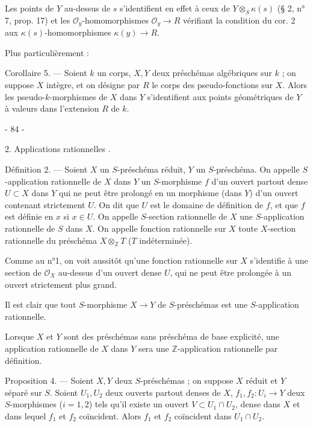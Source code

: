 Les points de $Y$ au-dessus de $s$ s'identifient en effet à ceux de $Y \otimes_S \kappa(s)$ (§ 2, n° 7, prop. 17) et les $\mathcal{O}_y$-homomorphismes $\mathcal{O}_y \to R$ vérifiant la condition du cor. 2 aux $\kappa(s)$-homomorphismes $\kappa(y) \to R$.

Plus particulièrement :

Corollaire 5. — Soient $k$ un corps, $X, Y$ deux préschémas algébriques sur $k$ ; on suppose $X$ intègre, et on désigne par $R$ le corps des pseudo-fonctions sur $X$. Alors les pseudo-$k$-morphismes de $X$ dans $Y$ s'identifient aux points géométriques de $Y$ à valeurs dans l'extension $R$ de $k$.

\newpage


- 84 -

2. Applications rationnelles .

Définition 2. — Soient $X$ un $S$-préschéma réduit, $Y$ un $S$-préschéma. On appelle $S$-application rationnelle de $X$ dans $Y$ un $S$-morphisme $f$ d'un ouvert partout dense $U \subset X$ dans $Y$ qui ne peut être prolongé en un morphisme (dans $Y$) d'un ouvert contenant strictement $U$. On dit que $U$ est le domaine de définition de $f$, et que $f$ est définie en $x$ si $x \in U$. On appelle $S$-section rationnelle de $X$ une $S$-application rationnelle de $S$ dans $X$. On appelle fonction rationnelle sur $X$ toute $X$-section rationnelle du préschéma $X \otimes_{\mathbb{Z}} T$ ($T$ indéterminée).

Comme au n°1, on voit aussitôt qu'une fonction rationnelle sur $X$ s'identifie à une section de $\mathcal{O}_X$ au-dessus d'un ouvert dense $U$, qui ne peut être prolongée à un ouvert strictement plus grand.

Il est clair que tout $S$-morphisme $X \to Y$ de $S$-préschémas est une $S$-application rationnelle.

Lorsque $X$ et $Y$ sont des préschémas sans préschéma de base explicité, une application rationnelle de $X$ dans $Y$ sera une $\mathbb{Z}$-application rationnelle par définition.

Proposition 4. — Soient $X, Y$ deux $S$-préschémas ; on suppose $X$ réduit et $Y$ séparé sur $S$. Soient $U_1, U_2$ deux ouverts partout denses de $X$, $f_1, f_2 : U_i \to Y$ deux $S$-morphismes ($i=1,2$) tels qu'il existe un ouvert $V \subset U_1 \cap U_2$, dense dans $X$ et dans lequel $f_1$ et $f_2$ coïncident. Alors $f_1$ et $f_2$ coïncident dans $U_1 \cap U_2$.

